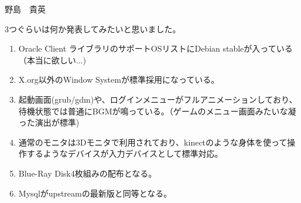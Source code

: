 \begin{prework}{ 野島　貴英 }


 3つぐらいは何か発表してみたいと思いました。


\begin{enumerate}
 \item  Oracle Client ライブラリのサポートOSリストにDebian stableが入っている（本当に欲しい...)
 \item  X.org以外のWindow Systemが標準採用になっている。
 \item  起動画面(grub/gdm)や、ログインメニューがフルアニメーションしており、待機状態では普通にBGMが鳴っている。（ゲームのメニュー画面みたいな凝った演出が標準)
 \item  通常のモニタは3Dモニタで利用されており、kinectのような身体を使って操作するようなデバイスが入力デバイスとして標準対応。
 \item  Blue-Ray Disk4枚組みの配布となる。
 \item  Mysqlがupstreamの最新版と同等となる。
\end{enumerate}

\end{prework}



